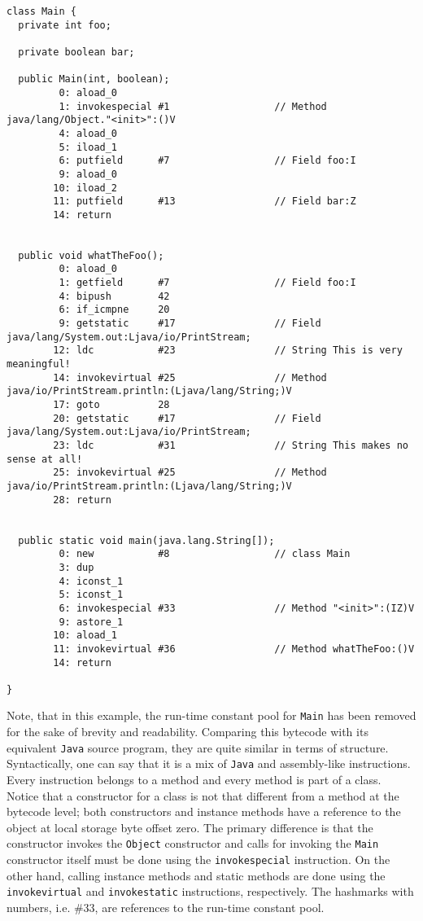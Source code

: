 \begin{lstlisting}
class Main {
  private int foo;

  private boolean bar;

  public Main(int, boolean);
         0: aload_0
         1: invokespecial #1                  // Method java/lang/Object."<init>":()V
         4: aload_0
         5: iload_1
         6: putfield      #7                  // Field foo:I
         9: aload_0
        10: iload_2
        11: putfield      #13                 // Field bar:Z
        14: return


  public void whatTheFoo();
         0: aload_0
         1: getfield      #7                  // Field foo:I
         4: bipush        42
         6: if_icmpne     20
         9: getstatic     #17                 // Field java/lang/System.out:Ljava/io/PrintStream;
        12: ldc           #23                 // String This is very meaningful!
        14: invokevirtual #25                 // Method java/io/PrintStream.println:(Ljava/lang/String;)V
        17: goto          28
        20: getstatic     #17                 // Field java/lang/System.out:Ljava/io/PrintStream;
        23: ldc           #31                 // String This makes no sense at all!
        25: invokevirtual #25                 // Method java/io/PrintStream.println:(Ljava/lang/String;)V
        28: return


  public static void main(java.lang.String[]);
         0: new           #8                  // class Main
         3: dup
         4: iconst_1
         5: iconst_1
         6: invokespecial #33                 // Method "<init>":(IZ)V
         9: astore_1
        10: aload_1
        11: invokevirtual #36                 // Method whatTheFoo:()V
        14: return

}
\end{lstlisting}

Note, that in this example, the run-time constant pool for \texttt{Main} has been removed for the sake of brevity and readability.
Comparing this bytecode with its equivalent \texttt{Java} source program, they are quite similar in terms of structure.
Syntactically, one can say that it is a mix of \texttt{Java} and assembly-like instructions. Every instruction belongs to a
method and every method is part of a class. Notice that a constructor for a class is not that different from a method at
the bytecode level; both constructors and instance methods have a reference to the object at local storage byte offset zero.
The primary difference is that the constructor invokes the \texttt{Object} constructor and calls
for invoking the \texttt{Main} constructor itself must be done using the \texttt{invokespecial} instruction. On the other
hand, calling instance methods and static methods are done using the \texttt{invokevirtual} and \texttt{invokestatic} instructions,
respectively. The hashmarks with numbers, i.e. \#33, are references to the run-time constant pool.
